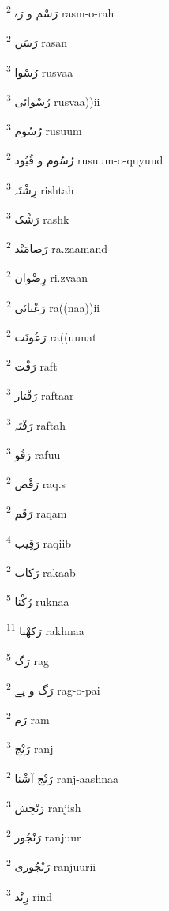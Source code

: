 \documentclass[12pt]{article}
\begin{document}
\begin{multicols}{5}
{\ur رَسْم و رَہ}   \textsuperscript{2} rasm-o-rah

{\ur رَسَن}   \textsuperscript{2} rasan

{\ur رُسْوا}   \textsuperscript{3} rusvaa

{\ur رُسْوائی}   \textsuperscript{3} rusvaa))ii

{\ur رُسُوم}   \textsuperscript{3} rusuum

{\ur رُسُوم و قُیُود}   \textsuperscript{2} rusuum-o-quyuud

{\ur رِشْتَہ}   \textsuperscript{3} rishtah

{\ur رَشْک}   \textsuperscript{3} rashk

{\ur رَضامَنْد}   \textsuperscript{2} ra.zaamand

{\ur رِضْوان}   \textsuperscript{2} ri.zvaan

{\ur رَعْنائی}   \textsuperscript{2} ra((naa))ii

{\ur رَعُونَت}   \textsuperscript{2} ra((uunat

{\ur رَفْت}   \textsuperscript{2} raft

{\ur رَفْتار}   \textsuperscript{3} raftaar

{\ur رَفْتَہ}   \textsuperscript{3} raftah

{\ur رَفُو}   \textsuperscript{3} rafuu

{\ur رَقْص}   \textsuperscript{2} raq.s

{\ur رَقَم}   \textsuperscript{2} raqam

{\ur رَقِیب}   \textsuperscript{4} raqiib

{\ur رَکاب}   \textsuperscript{2} rakaab

{\ur رُکْنا}   \textsuperscript{5} ruknaa

{\ur رَکھْنا}   \textsuperscript{11} rakhnaa

{\ur رَگ}   \textsuperscript{5} rag

{\ur رَگ و پے}   \textsuperscript{2} rag-o-pai

{\ur رَم}   \textsuperscript{2} ram

{\ur رَنْج}   \textsuperscript{3} ranj

{\ur رَنْج آشْنا}   \textsuperscript{2} ranj-aashnaa

{\ur رَنْجِش}   \textsuperscript{3} ranjish

{\ur رَنْجُور}   \textsuperscript{2} ranjuur

{\ur رَنْجُوری}   \textsuperscript{2} ranjuurii

{\ur رِنْد}   \textsuperscript{3} rind


\end{multicols}
\end{document}
